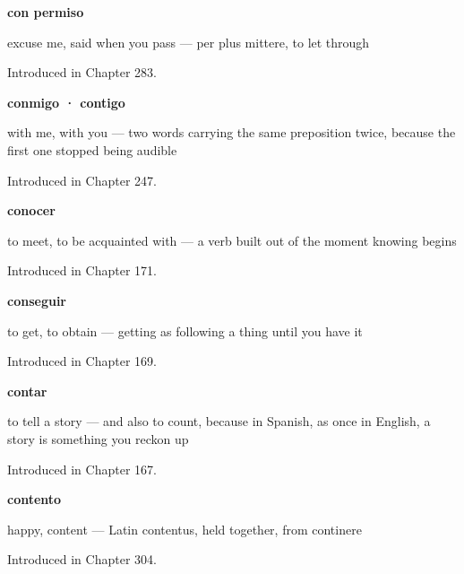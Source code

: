 \noindent\begin{minipage}[t]{\linewidth}
\raggedright
\textbf{con permiso}\par
\small excuse me, said when you pass — per plus mittere, to let through\par
\footnotesize Introduced in Chapter 283.
\end{minipage}\par\medskip

\noindent\begin{minipage}[t]{\linewidth}
\raggedright
\textbf{conmigo · contigo}\par
\small with me, with you — two words carrying the same preposition twice, because the first one stopped being audible\par
\footnotesize Introduced in Chapter 247.
\end{minipage}\par\medskip

\noindent\begin{minipage}[t]{\linewidth}
\raggedright
\textbf{conocer}\par
\small to meet, to be acquainted with — a verb built out of the moment knowing begins\par
\footnotesize Introduced in Chapter 171.
\end{minipage}\par\medskip

\noindent\begin{minipage}[t]{\linewidth}
\raggedright
\textbf{conseguir}\par
\small to get, to obtain — getting as following a thing until you have it\par
\footnotesize Introduced in Chapter 169.
\end{minipage}\par\medskip

\noindent\begin{minipage}[t]{\linewidth}
\raggedright
\textbf{contar}\par
\small to tell a story — and also to count, because in Spanish, as once in English, a story is something you reckon up\par
\footnotesize Introduced in Chapter 167.
\end{minipage}\par\medskip

\noindent\begin{minipage}[t]{\linewidth}
\raggedright
\textbf{contento}\par
\small happy, content — Latin contentus, held together, from continere\par
\footnotesize Introduced in Chapter 304.
\end{minipage}\par\medskip

